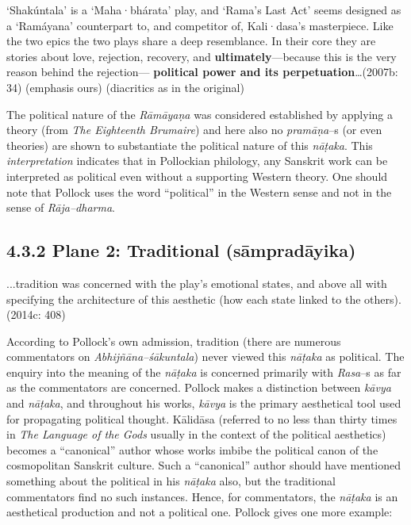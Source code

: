 \begin{myquote}
‘Shakúntala’ is a ‘Maha·bhárata’ play, and ‘Rama’s Last Act’ seems designed as a ‘Ramáyana’ counterpart to, and competitor of, Kali·dasa’s masterpiece. Like the two epics the two plays share a deep resemblance. In their core they are stories about love, rejection, recovery, and \textbf{ultimately}—because this is the very reason behind the rejection— \textbf{political power and its perpetuation}…(2007b: 34) (emphasis ours) (diacritics as in the original)
\end{myquote}

The political nature of the \textit{Rāmāyaṇa }was considered established by applying a theory (from\textit{ The Eighteenth Brumaire}) and here also no \textit{pramāṇa}–s (or even theories) are shown to substantiate the political nature of this \textit{nāṭaka}. This \textit{interpretation} indicates that in Pollockian philology, any Sanskrit work can be interpreted as political even without a supporting Western theory. One should note that Pollock uses the word “political” in the Western sense and not in the sense of \textit{Rāja–dharma}.


\subsection*{4.3.2 Plane 2: Traditional (sāmpradāyika)}

\begin{myquote}
...tradition was concerned with the play’s emotional states, and above all with specifying the architecture of this aesthetic (how each state linked to the others). (2014c: 408)
\end{myquote}

According to Pollock’s own admission, tradition (there are numerous commentators on \textit{Abhijñāna–śākuntala}) never viewed this \textit{nāṭaka }as political. The enquiry into the meaning of the \textit{nāṭaka }is concerned primarily with \textit{Rasa}–s as far as the commentators are concerned. Pollock makes a distinction between \textit{kāvya} and \textit{nāṭaka}, and throughout his works,\textit{ kāvya }is the primary aesthetical tool used for propagating political thought. Kālidāsa (referred to no less than thirty times in \textit{The Language of the Gods} usually in the context of the political aesthetics) becomes a “canonical” author whose works imbibe the political canon of the cosmopolitan Sanskrit culture. Such a “canonical” author should have mentioned something about the political in his \textit{nāṭaka }also, but the traditional commentators find no such instances. Hence, for commentators, the \textit{nāṭaka }is an aesthetical production and not a political one. Pollock gives one more example:

